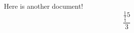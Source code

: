 \documentclass{article}
\begin{document}
Here is another document!
\[\frac{\frac{1}{\frac{3}{4}}{5}}{3}\]
\end{document}
